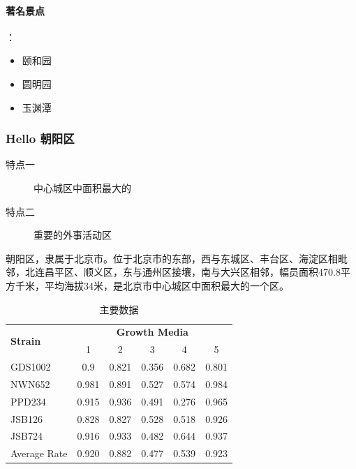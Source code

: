 \documentclass[UTF8, 12pt, oneside]{ctexart}
\begin{document}
\paragraph{著名景点}：
\begin{itemize}
	\item 颐和园
	\item 圆明园
	\item 玉渊潭
\end{itemize}

\subsubsection{Hello 朝阳区}
\begin{description}
	\item[特点一] 中心城区中面积最大的
	\item[特点二] 重要的外事活动区
\end{description}

朝阳区，隶属于北京市。位于北京市的东部，西与东城区、丰台区、海淀区相毗邻，北连昌平区、顺义区，东与通州区接壤，南与大兴区相邻，幅员面积470.8平方千米，平均海拔34米，是北京市中心城区中面积最大的一个区。

\begin{table}[htbp]                %
	\centering                         %
	\caption{主要数据}\label{maindata}
	\begin{tabular}{l c c c c c}       %
		\toprule[1.5pt]                      %
		\multirow{2}{*}{\textbf{Strain}} & \multicolumn{5}{c}{\textbf{Growth Media}}                                 \\
		\cmidrule(l){2-6}
		                                 & 1                                         & 2     & 3     & 4     & 5     \\ %
		\midrule %
		GDS1002                          & 0.9                                       & 0.821 & 0.356 & 0.682 & 0.801 \\ %
		NWN652                           & 0.981                                     & 0.891 & 0.527 & 0.574 & 0.984 \\ %
		PPD234                           & 0.915                                     & 0.936 & 0.491 & 0.276 & 0.965 \\ %
		JSB126                           & 0.828                                     & 0.827 & 0.528 & 0.518 & 0.926 \\ %
		JSB724                           & 0.916                                     & 0.933 & 0.482 & 0.644 & 0.937 \\ %
		\midrule %
		\midrule %
		Average Rate                     & 0.920                                     & 0.882 & 0.477 & 0.539 & 0.923 \\ %
		\bottomrule[1.5pt]               %
	\end{tabular}

\end{table}
\end{document}
